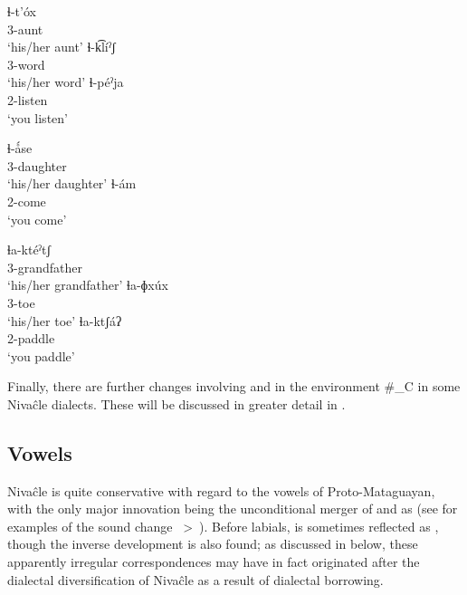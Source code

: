 \ea\label{ex:lhlha:1:niv}
    \begin{xlist}
        \ex\gll ɬ-t’óx \\
                3{\SG}-aunt \\
                \glt `his/her aunt'
        \ex\gll ɬ-k͡líˀʃ \\
                3{\SG}-word \\
                \glt `his/her word'
        \ex\gll ɬ-péˀja \\
                2{\SG}-listen \\
                \glt `you listen'
    \end{xlist}
\z

\ea\label{ex:lhlha:2:niv}
    \begin{xlist}
        \ex\gll ɬ-ǻse \\
                3{\SG}-daughter \\
                \glt `his/her daughter'
        \ex\gll ɬ-ám \\
                2{\SG}-come \\
                \glt `you come'
    \end{xlist}
\z

\ea\label{ex:lhlha:3:niv}
    \begin{xlist}
        \ex\gll ɬa-ktéˀtʃ \\
                3{\SG}-grandfather \\
                \glt `his/her grandfather'
        \ex\gll ɬa-ɸxúx \\
                3{\SG}-toe \\
                \glt `his/her toe'
        \ex\gll ɬa-ktʃáʔ \\
                2{\SG}-paddle \\
                \glt `you paddle'
    \end{xlist}
\z

Finally, there are further changes involving  and  in the environment \#\_C in some Nivaĉle dialects. These will be discussed in greater detail in .

\subsection{Vowels}\label{ni-vowels}

Nivaĉle is quite conservative with regard to the vowels of Proto-Mataguayan, with the only major innovation being the unconditional merger of  and  as  (see  for examples of the sound change ~>~). Before labials,  is sometimes reflected as , though the inverse development is also found; as discussed in  below, these apparently irregular correspondences may have in fact originated after the dialectal diversification of Nivaĉle as a result of dialectal borrowing.

